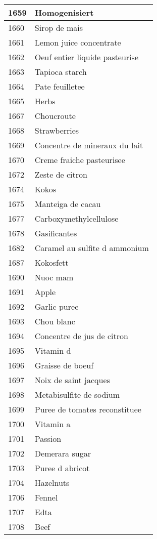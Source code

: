 \begin{longtable}{|l|l|}
1659 & Homogenisiert \\ \hline 
1660 & Sirop de mais \\ \hline 
1661 & Lemon juice concentrate \\ \hline 
1662 & Oeuf entier liquide pasteurise \\ \hline 
1663 & Tapioca starch \\ \hline 
1664 & Pate feuilletee \\ \hline 
1665 & Herbs \\ \hline 
1667 & Choucroute \\ \hline 
1668 & Strawberries \\ \hline 
1669 & Concentre de mineraux du lait \\ \hline 
1670 & Creme fraiche pasteurisee \\ \hline 
1672 & Zeste de citron \\ \hline 
1674 & Kokos \\ \hline 
1675 & Manteiga de cacau \\ \hline 
1677 & Carboxymethylcellulose \\ \hline 
1678 & Gasificantes \\ \hline 
1682 & Caramel au sulfite d ammonium \\ \hline 
1687 & Kokosfett \\ \hline 
1690 & Nuoc mam \\ \hline 
1691 & Apple \\ \hline 
1692 & Garlic puree \\ \hline 
1693 & Chou blanc \\ \hline 
1694 & Concentre de jus de citron \\ \hline 
1695 & Vitamin d \\ \hline 
1696 & Graisse de boeuf \\ \hline 
1697 & Noix de saint jacques \\ \hline 
1698 & Metabisulfite de sodium \\ \hline 
1699 & Puree de tomates reconstituee \\ \hline 
1700 & Vitamin a \\ \hline 
1701 & Passion \\ \hline 
1702 & Demerara sugar \\ \hline 
1703 & Puree d abricot \\ \hline 
1704 & Hazelnuts \\ \hline 
1706 & Fennel \\ \hline 
1707 & Edta \\ \hline 
1708 & Beef \\ \hline 

\end{longtable}
